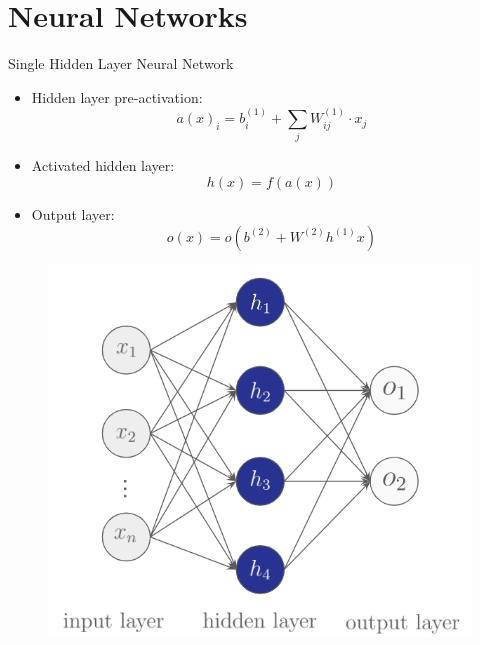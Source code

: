 \documentclass[serif, aspectratio=169]{beamer}
\begin{document}
\section{Neural Networks}
\begin{frame}{Single Hidden Layer Neural Network}
    \begin{itemize}
        \item Hidden layer pre-activation:
        $$a(x)_i = b^{(1)}_i + \sum_j W^{(1)}_{ij} \cdot x_j$$
        \item Activated hidden layer:
        $$h(x) = f(a(x))$$
        \item Output layer:
        $$ o(x) = o\left(b^{(2)} + W^{(2)}h^{(1)}x \right) $$
    \end{itemize}
    \endminipage
    \hfill
        \begin{figure}[bh]
            \includegraphics[width=\linewidth]{pic/2/single-hidden_nn.png}
        \end{figure}
    \endminipage
\end{frame}
\end{document}
